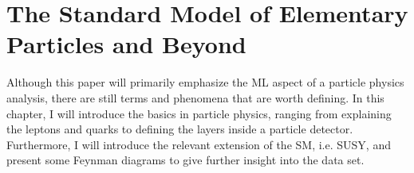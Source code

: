 \chapter{The Standard Model of Elementary Particles and Beyond}
Although this paper will primarily emphasize the \ac{ML} aspect of a particle physics analysis, there are still terms and phenomena that are 
worth defining. In this chapter, I will introduce the basics in particle physics, ranging from explaining the leptons and quarks to defining 
the layers inside a particle detector. Furthermore, I will introduce the relevant extension of the \ac{SM}, i.e. \ac{SUSY}, and present some 
Feynman diagrams to give further insight into the data set.